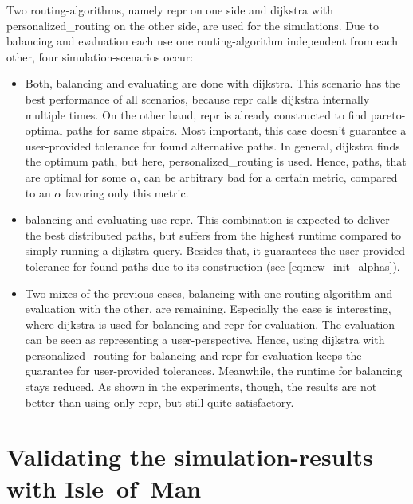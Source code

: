     Two routing-algorithms, namely \gls{repr} on one side and \gls{dijkstra} with \gls{personalized_routing} on the other side, are used for the simulations.
    Due to \gls{balancing} and evaluation each use one routing-algorithm independent from each other, four simulation-scenarios occur:
    \begin{itemize}
        \item Both, \gls{balancing} and evaluating are done with \gls{dijkstra}.
            This scenario has the best performance of all scenarios, because \gls{repr} calls \gls{dijkstra} internally multiple times.
            On the other hand, \gls{repr} is already constructed to find pareto-optimal paths for same \glspl{stpair}.
            Most important, this case doesn't guarantee a user-provided tolerance for found alternative paths.
            In general, \gls{dijkstra} finds the optimum path, but here, \gls{personalized_routing} is used.
            Hence, paths, that are optimal for some $\alpha$, can be arbitrary bad for a certain \gls{metric}, compared to an $\alpha$ favoring only this \gls{metric}.
        \item \Gls{balancing} and evaluating use \gls{repr}.
            This combination is expected to deliver the best distributed paths, but suffers from the highest runtime compared to simply running a \gls{dijkstra}-query.
            Besides that, it guarantees the user-provided tolerance for found paths due to its construction (see \vref{eq:new_init_alphas}).
        \item Two mixes of the previous cases, \gls{balancing} with one routing-algorithm and evaluation with the other, are remaining.
            Especially the case is interesting, where \gls{dijkstra} is used for \gls{balancing} and \gls{repr} for evaluation.
            The evaluation can be seen as representing a user-perspective.
            Hence, using \gls{dijkstra} with \gls{personalized_routing} for \gls{balancing} and \gls{repr} for evaluation keeps the guarantee for user-provided tolerances.
            Meanwhile, the runtime for \gls{balancing} stays reduced.
            As shown in the experiments, though, the results are not better than using only \gls{repr}, but still quite satisfactory.
    \end{itemize}

\section{Validating the simulation-results with Isle~of~Man}

